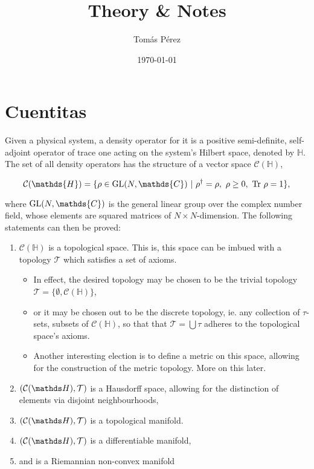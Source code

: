 \documentclass{homework}
\author{Tomás Pérez}
\date{\today}
\title{Theory \& Notes}
\begin{document}
 \maketitle

\section{Cuentitas}

Given a physical system, a density operator for it is a positive semi-definite, self-adjoint operator of trace one acting on the system's Hilbert space, denoted by $\mathds{H}$. The set of all density operators has the structure of a vector space $\mathcal{C}(\mathds{H})$,

$$
\mathcal{C}(\mathds{H}) = \{ \rho \in \textnormal{GL}(N, \mathds{C}) \blanky | \blanky \rho^\dagger = \rho, \blanky \rho \geq 0, \blanky \textnormal{Tr } \rho = 1 \},
$$

where $\textnormal{GL}(N, \mathds{C})$ is the general linear group over the complex number field, whose elements are squared matrices of $N \times N$-dimension. The following statements can then be proved:

\begin{enumerate}
    \item $\mathcal{C}(\mathds{H})$ is a topological space. This is, this space can be imbued with a topology $\mathcal{T}$ which satisfies a set of axioms. 
    \begin{itemize}
        \item In effect, the desired topology may be chosen to be the trivial topology $\mathcal{T} = \{\emptyset, \mathcal{C}(\mathds{H})\}$,
        \item or it may be chosen out to be the discrete topology, ie. any collection of $\tau$-sets, subsets of $\mathcal{C}(\mathds{H})$, so that that $\mathcal{T} = \bigcup \tau$ adheres to the topological space's axioms. 
        \item Another interesting election is to define a metric on this space, allowing for the construction of the metric topology. More on this later.   
    \end{itemize}
    \item $\topospace$ is a Hausdorff space, allowing for the distinction of elements via disjoint neighbourhoods, 
    \item $\topospace$ is a topological manifold. \item $\topospace$ is a differentiable manifold,
    \item and is a Riemannian non-convex manifold
\end{enumerate}
\end{document}
